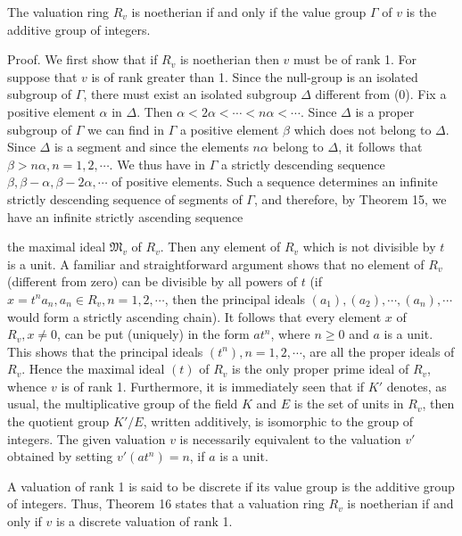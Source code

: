 The valuation ring $R_v$ is noetherian if and only if the value group $\Gamma$ of $v$ is the additive group of integers.

Proof. We first show that if $R_v$ is noetherian then $v$ must be of rank 1. For suppose that $v$ is of rank greater than 1. Since the null-group is an isolated subgroup of $\Gamma$, there must exist an isolated subgroup $\Delta$ different from (0). Fix a positive element $\alpha$ in $\Delta$. Then $\alpha < 2\alpha < \cdots < n\alpha < \cdots$. Since $\Delta$ is a proper subgroup of $\Gamma$ we can find in $\Gamma$ a positive element $\beta$ which does not belong to $\Delta$. Since $\Delta$ is a segment and since the elements $n\alpha$ belong to $\Delta$, it follows that $\beta > n\alpha, n = 1, 2, \cdots$. We thus have in $\Gamma$ a strictly descending sequence $\beta, \beta - \alpha, \beta - 2\alpha, \cdots$ of positive elements. Such a sequence determines an infinite strictly descending sequence of segments of $\Gamma$, and therefore, by Theorem 15, we have an infinite strictly ascending sequence

the maximal ideal $\mathfrak{M}_v$ of $R_v$. Then any element of $R_v$ which is not divisible by $t$ is a unit. A familiar and straightforward argument shows that no element of $R_v$ (different from zero) can be divisible by all powers of $t$ (if $x = t^n a_n, a_n \in R_v, n = 1, 2, \cdots$, then the principal ideals $(a_1), (a_2), \cdots, (a_n), \cdots$ would form a strictly ascending chain). It follows that every element $x$ of $R_v, x \neq 0$, can be put (uniquely) in the form $at^n$, where $n \geq 0$ and $a$ is a unit. This shows that the principal ideals $(t^n), n = 1, 2, \cdots$, are all the proper ideals of $R_v$. Hence the maximal ideal $(t)$ of $R_v$ is the only proper prime ideal of $R_v$, whence $v$ is of rank 1. Furthermore, it is immediately seen that if $K'$ denotes, as usual, the multiplicative group of the field $K$ and $E$ is the set of units in $R_v$, then the quotient group $K'/E$, written additively, is isomorphic to the group of integers. The given valuation $v$ is necessarily equivalent to the valuation $v'$ obtained by setting $v'(at^n) = n$, if $a$ is a unit.

A valuation of rank 1 is said to be discrete if its value group is the additive group of integers. Thus, Theorem 16 states that a valuation ring $R_v$ is noetherian if and only if $v$ is a discrete valuation of rank 1.